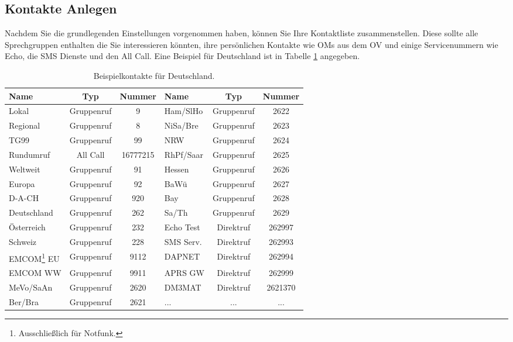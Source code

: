 \subsection{Kontakte Anlegen} \label{sec:cp:contact}
Nachdem Sie die grundlegenden Einstellungen vorgenommen haben, können Sie Ihre Kontaktliste zusammenstellen. Diese sollte alle Sprechgruppen enthalten die Sie interessieren könnten, ihre persönlichen Kontakte wie OMs aus dem OV und einige Servicenummern wie Echo, die SMS Dienste und den All Call. Eine Beispiel für Deutschland ist in Tabelle \ref{tab:contacts} angegeben.

\begin{table}[!ht]
 \centering
 \begin{tabular}{|l|c|c||l|c|c|}\hline
  Name        & Typ        & Nummer & Name & Typ & Nummer \\ \hline
  Lokal       & Gruppenruf & 9        & Ham/SlHo    & Gruppenruf & 2622 \\
  Regional    & Gruppenruf & 8        & NiSa/Bre    & Gruppenruf & 2623 \\
  TG99        & Gruppenruf & 99       & NRW         & Gruppenruf & 2624 \\
  Rundumruf   & All Call   & 16777215 & RhPf/Saar   & Gruppenruf & 2625 \\
  Weltweit    & Gruppenruf & 91       & Hessen      & Gruppenruf & 2626 \\
  Europa      & Gruppenruf & 92       & BaWü        & Gruppenruf & 2627 \\
  D-A-CH      & Gruppenruf & 920      & Bay         & Gruppenruf & 2628 \\
  Deutschland & Gruppenruf & 262      & Sa/Th       & Gruppenruf & 2629 \\
  Österreich  & Gruppenruf & 232      & Echo Test   & Direktruf  & 262997 \\
  Schweiz     & Gruppenruf & 228      & SMS Serv.   & Direktruf  & 262993 \\
  EMCOM\footnote{Ausschließlich für Notfunk.} EU    & Gruppenruf & 9112 & 
  DAPNET      & Direktruf  & 262994 \\
  EMCOM WW    & Gruppenruf & 9911     & APRS GW     & Direktruf  & 262999 \\
  MeVo/SaAn   & Gruppenruf & 2620     & DM3MAT      & Direktruf  & 2621370 \\
  Ber/Bra     & Gruppenruf & 2621     & ...         & ...        & ... \\ \hline
 \end{tabular}
 \caption{Beispielkontakte für Deutschland.} \label{tab:contacts}
\end{table}

